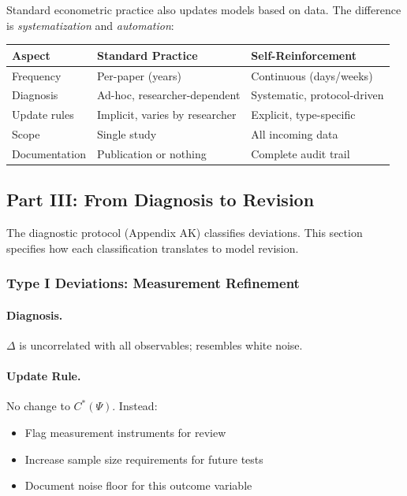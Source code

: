 Standard econometric practice also updates models based on data. The difference 
is \emph{systematization} and \emph{automation}:

\begin{center}
\renewcommand{\arraystretch}{1.3}
\begin{tabular}{|l|p{5cm}|p{5cm}|}
\hline
\textbf{Aspect} & \textbf{Standard Practice} & \textbf{Self-Reinforcement} \\
\hline
Frequency & Per-paper (years) & Continuous (days/weeks) \\
Diagnosis & Ad-hoc, researcher-dependent & Systematic, protocol-driven \\
Update rules & Implicit, varies by researcher & Explicit, type-specific \\
Scope & Single study & All incoming data \\
Documentation & Publication or nothing & Complete audit trail \\
\hline
\end{tabular}
\end{center}

\subsection{Part III: From Diagnosis to Revision}

The diagnostic protocol (Appendix AK) classifies deviations. This section 
specifies how each classification translates to model revision.

\subsubsection{Type I Deviations: Measurement Refinement}

\paragraph{Diagnosis.}
$\Delta$ is uncorrelated with all observables; resembles white noise.

\paragraph{Update Rule.}
No change to $C^*(\Psi)$. Instead:
\begin{itemize}
    \item Flag measurement instruments for review
    \item Increase sample size requirements for future tests
    \item Document noise floor for this outcome variable
\end{itemize}

